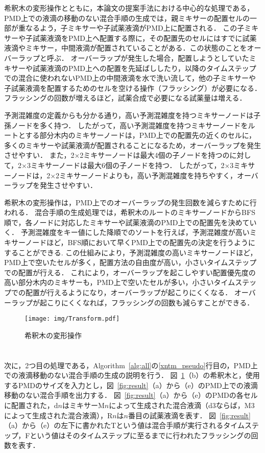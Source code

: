 希釈木の変形操作とともに，本論文の提案手法における中心的な処理である，PMD上での液滴の移動のない混合手順の生成では，親ミキサーの配置セルの一部が重なるよう，子ミキサーや子試薬液滴がPMD上に配置される．
この子ミキサーや子試薬液滴をPMD上へ配置する際に，その配置先のセルにはすでに試薬液滴やミキサー，中間液滴が配置されていることがある．この状態のことをオーバーラップと呼ぶ．
オーバーラップが発生した場合，配置しようとしていたミキサーや試薬液滴のPMD上への配置を先延ばししたり，以降のタイムステップでの混合に使われないPMD上の中間液滴を水で洗い流して，他の子ミキサーや子試薬液滴を配置するためのセルを空ける操作（フラッシング）が必要になる．
フラッシングの回数が増えるほど，試薬合成で必要になる試薬量は増える．

予測混雑度の定義からも分かる通り，高い予測混雑度を持つミキサーノードは子孫ノードを多く持つ．
したがって，高い予測混雑度を持つミキサーノードをルートとする部分木内のミキサーノードは，PMD上での配置先の近くのセルに，多くのミキサーや試薬液滴が配置されることになるため，オーバーラップを発生させやすい．
また，2$\times$2ミキサーノードは最大4個の子ノードを持つのに対して，2$\times$3ミキサーノードは最大6個の子ノードを持つ．
したがって，2$\times$3ミキサーノードは，2$\times$2ミキサーノードよりも，高い予測混雑度を持ちやすく，オーバーラップを発生させやすい．

希釈木の変形操作は，PMD上でのオーバーラップの発生回数を減らすために行われる．
混合手順の生成処理では，希釈木のルートのミキサーノードからBFS順で，各ノードに対応したミキサーや試薬液滴のPMD上での配置先を決めていく．
予測混雑度をキー値にした降順でのソートを行えば，予測混雑度が高いミキサーノードほど，BFS順において早くPMD上での配置先の決定を行うようにすることができる.
この仕組みにより，予測混雑度の高いミキサーノードほど，PMD上で空いたセルが多く，配置方法の自由度が高い，小さいタイムステップでの配置が行える．
これにより，オーバーラップを起こしやすい配置優先度の高い部分木内のミキサーも，PMD上で空いたセルが多い，小さいタイムステップでの配置が行えるようになり，オーバーラップが起こりにくくなる．
オーバーラップが起こりにくくなれば，フラッシングの回数も減らすことができる．

\begin{figure}[tbp]
 \centering\texttt{[image: img/Transform.pdf]}
 \caption{希釈木の変形操作}\label{fig:Transform}
\end{figure}


\section{}
次に，2つ目の処理である，Algorithm~\ref{alg:all}の\ref{xntm_pseudo}行目の，PMD上での液滴移動のない混合手順の生成の説明を行う．
図~\ref{fig:Transform}（b）の希釈木と，使用するPMDのサイズを入力とし，図~\ref{fig:result}（a）から（e）のPMD上での液滴移動のない混合手順を出力する．
図~\ref{fig:result}（a）から（e）のPMDの各セルに配置された，d$n$はミキサーM$n$によって生成された混合液滴（d3ならば，M3によって生成された混合液滴），R$n$は$n$番目の試薬液滴を表す．
図~\ref{fig:result}（a）から（e）の左下に書かれたTという値は混合手順が実行されるタイムステップ，Fという値はそのタイムステップに至るまでに行われたフラッシングの回数を表す．

